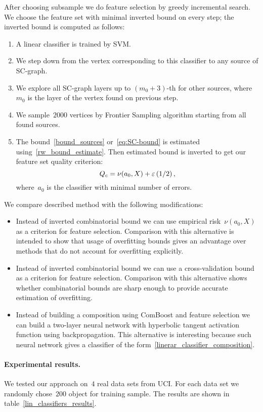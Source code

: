 \documentclass{article}
\begin{document}
After choosing subsample we do feature selection by greedy incremental search.
We choose the feature set with minimal inverted bound on every step;
the inverted bound is computed as follows:
\begin{enumerate}
    \item A linear classifier is trained by SVM.
    \item We step down from the vertex corresponding to this classifier to any source of SC-graph.
    \item We explore all SC-graph layers up to $(m_0 + 3)$-th for other sources,
        where $m_0$ is the layer of the vertex found on previous step.
    \item We sample~$2000$ vertices by Frontier Sampling algorithm starting from all found sources.
    \item The bound~\eqref{bound_sources} or~\eqref{eq:SC-bound} is estimated
        using~\eqref{rw_bound_estimate}.
        Then estimated bound is inverted to get our feature set quality criterion:
        \[
            Q_c = \nu(a_0, X) + \varepsilon \left(1/2\right),
        \]
        where~$a_0$ is the classifier with minimal number of errors.
\end{enumerate}

We compare described method with the following modifications:
\begin{itemize}
    \item Instead of inverted combinatorial bound we can use empirical risk~$\nu(a_0, X)$
        as a criterion for feature selection.
        Comparison with this alternative is intended to show that usage of overfitting bounds
        gives an advantage over methods that do not account for overfitting explicitly.
    \item Instead of inverted combinatorial bound we can use a cross-validation bound
        as a criterion for feature selection. Comparison with this alternative shows
        whether combinatorial bounds are sharp enough to provide accurate estimation of overfitting.
    \item Instead of building a composition using ComBoost and feature selection
        we can build a two-layer neural network with hyperbolic tangent
        activation function using backpropagation. This alternative is interesting
        because such neural network gives a classifier
        of the form~\eqref{linerar_classifier_composition}.
\end{itemize}

\paragraph{Experimental results.}
We tested our approach on~$4$ real data sets from UCI.
For each data set we randomly chose~$200$ object for training sample.
The results are shown in table~\ref{lin_classifiers_results}.
\end{document}
